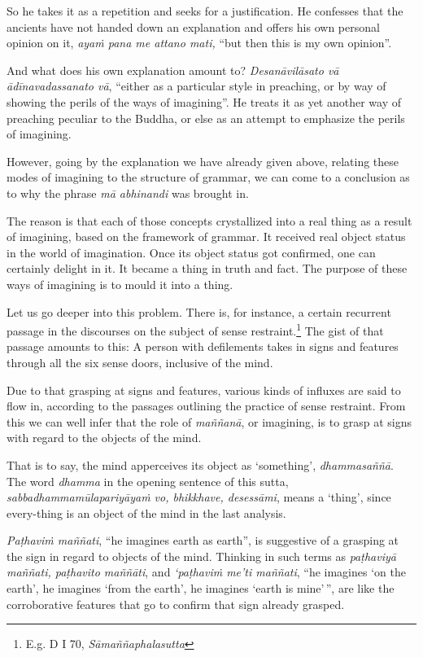 So he takes it as a repetition and seeks for a justification. He confesses that the ancients have not handed down an explanation and offers his own personal opinion on it, \emph{ayaṁ pana me attano mati,} ``but then this is my own opinion''.

And what does his own explanation amount to? \emph{Desanāvilāsato vā ādīnavadassanato vā}, ``either as a particular style in preaching, or by way of showing the perils of the ways of imagining''. He treats it as yet another way of preaching peculiar to the Buddha, or else as an attempt to emphasize the perils of imagining.

However, going by the explanation we have already given above, relating these modes of imagining to the structure of grammar, we can come to a conclusion as to why the phrase \emph{mā abhinandi} was brought in.

The reason is that each of those concepts crystallized into a real thing as a result of imagining, based on the framework of grammar. It received real object status in the world of imagination. Once its object status got confirmed, one can certainly delight in it. It became a thing in truth and fact. The purpose of these ways of imagining is to mould it into a thing.

Let us go deeper into this problem. There is, for instance, a certain recurrent passage in the discourses on the subject of sense restraint.\footnote{E.g. D I 70, \emph{Sāmaññaphalasutta}} The gist of that passage amounts to this: A person with defilements takes in signs and features through all the six sense doors, inclusive of the mind.

Due to that grasping at signs and features, various kinds of influxes are said to flow in, according to the passages outlining the practice of sense restraint. From this we can well infer that the role of \emph{maññanā}, or imagining, is to grasp at signs with regard to the objects of the mind.

That is to say, the mind apperceives its object as `something', \emph{dhammasaññā}. The word \emph{dhamma} in the opening sentence of this sutta, \emph{sabbadhammamūlapariyāyaṁ vo, bhikkhave, desessāmi}, means a `thing', since every-thing is an object of the mind in the last analysis.

\emph{Paṭhaviṁ maññati}, ``he imagines earth as earth'', is suggestive of a grasping at the sign in regard to objects of the mind. Thinking in such terms as \emph{paṭhaviyā maññati, paṭhavito maññāti}, and \emph{`paṭhaviṁ me'ti maññati}, ``he imagines `on the earth', he imagines `from the earth', he imagines `earth is mine'\,'', are like the corroborative features that go to confirm that sign already grasped.

